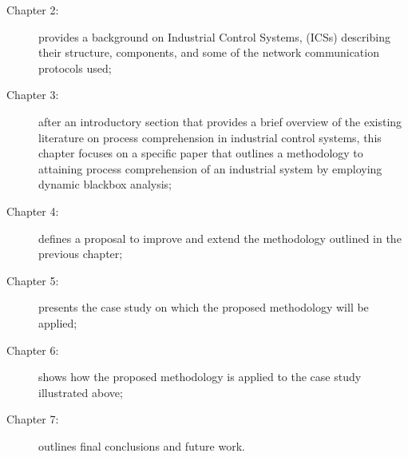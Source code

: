 \begin{description}
	\item [Chapter 2:] provides a background on Industrial Control Systems, (ICSs) describing their structure, components, and some of the network communication protocols used;
	
	\item [Chapter 3:] after an introductory section that provides a brief overview of the existing literature on process comprehension in industrial control systems, this chapter focuses on a specific paper that outlines a methodology to attaining process comprehension of an industrial system by employing dynamic blackbox analysis;
	
	\item [Chapter 4:] defines a proposal to improve and extend the methodology outlined in the previous chapter;
	
	\item [Chapter 5:] presents the case study on which the proposed methodology will be applied;
	
	\item [Chapter 6:] shows how the proposed methodology is applied to the case study illustrated above;
	
	\item [Chapter 7:] outlines final conclusions and future work.
\end{description}

\vfill
\nolinenumbers